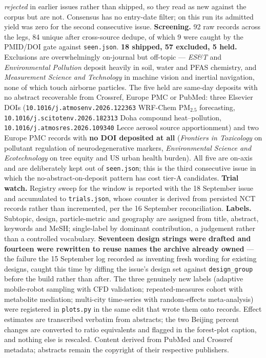 \documentclass[10pt]{article}
\begin{document}
\begin{keybox}
{\emph{rejected} in earlier issues rather than shipped, so they read as new against the
corpus but are not. Consensus has no entry-date filter; on this run its admitted yield was
zero for the second consecutive issue.
\textbf{Screening.} 92 raw records across the legs, 84 unique after cross-source dedupe, of
which 9 were caught by the PMID/DOI gate against \texttt{seen.json}.
\textbf{18 shipped, 57 excluded, 5 held.} Exclusions are overwhelmingly on-journal but
off-topic --- \textit{ES\&T} and \textit{Environmental Pollution} deposit heavily in soil,
water and PFAS chemistry, and \textit{Measurement Science and Technology} in machine vision
and inertial navigation, none of which touch airborne particles. The five held are same-day
deposits with no abstract recoverable from Crossref, Europe PMC or PubMed: three Elsevier
DOIs (\texttt{10.1016/j.atmosenv.2026.122363} WRF-Chem PM$_{2.5}$ forecasting,
\texttt{10.1016/j.scitotenv.2026.182313} Doha compound heat--pollution,
\texttt{10.1016/j.atmosres.2026.109340} Lecce aerosol source apportionment) and two Europe
PMC records with \textbf{no DOI deposited at all} (\textit{Frontiers in Toxicology} on
pollutant regulation of neurodegenerative markers, \textit{Environmental Science and
Ecotechnology} on tree equity and US urban health burden). All five are on-axis and are
deliberately kept out of \texttt{seen.json}; this is the third consecutive issue in which
the no-abstract-on-deposit pattern has cost tier-A candidates.
\textbf{Trial watch.} Registry sweep for the window is reported with the 18 September issue
and accumulated to \texttt{trials.json}, whose counter is derived from persisted NCT records
rather than incremented, per the 16 September reconciliation.
\textbf{Labels.} Subtopic, design, particle-metric and geography are assigned from title,
abstract, keywords and MeSH; single-label by dominant contribution, a judgement rather than
a controlled vocabulary. \textbf{Seventeen design strings were drafted and fourteen were
rewritten to reuse names the archive already owned} --- the failure the 15 September log
recorded as inventing fresh wording for existing designs, caught this time by diffing the
issue's design set against \texttt{design\_group} before the build rather than after. The
three genuinely new labels (adaptive mobile-robot sampling with CFD validation;
repeated-measures cohort with metabolite mediation; multi-city time-series with
random-effects meta-analysis) were registered in \texttt{plots.py} in the same edit that
wrote them onto records.
Effect estimates are transcribed verbatim from abstracts; the two Beijing percent changes
are converted to ratio equivalents and flagged in the forest-plot caption, and nothing else
is rescaled.
Content derived from PubMed and Crossref metadata; abstracts remain the copyright of their
respective publishers.\par}
\end{keybox}
\end{document}
